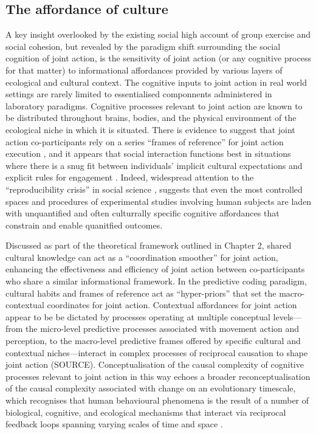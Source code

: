 \subsection{The affordance of culture}
A key insight overlooked by the existing social high account of group exercise and social cohesion, but revealed by the paradigm shift surrounding the social cognition of joint action, is the sensitivity of joint action (or any cognitive process for that matter) to informational affordances provided by various layers of ecological and cultural context.  The cognitive inputs to joint action in real world settings are rarely limited to essentialised componnents administered in laboratory paradigms. Cognitive processes relevant to joint action are known to be distributed throughout brains, bodies, and the physical environment of the ecological niche in which it is situated.  There is evidence to suggest that joint action co-participants rely on a series ``frames of reference'' for joint action execution \citep{Ray2018}, and it appears that social interaction functions best in situations where there is a snug fit between individuals' implicit cultural expectations and explicit rules for engagement \citep{Vollan2017}.  Indeed, widespread attention to the ``reproducibility crisis'' in social science \citep{Earp2015,Rathmacher2017}, suggests that even the most controlled spaces and procedures of experimental studies involving human subjects are laden with unquantified and often culturrally specific cognitive affordances that constrain and enable quanitfied outcomes.

Discussed as part of the theoretical framework outlined in Chapter 2, shared cultural knowledge can act as a ``coordination smoother'' \citep{Vesper2017} for joint action, enhancing the effectiveness and efficiency of joint action between co-participants who share a similar informational framework.  In the predictive coding paradigm, cultural habits and frames of reference act as ``hyper-priors'' that set the macro-contextual coordinates for joint action\citep{Clark2013}.  Contextual affordances for joint action appear to be be dictated by processes operating at multiple conceptual levels---from the micro-level predictive processes associated with movement action and perception, to the macro-level predictive frames offered by specific cultural and contextual niches---interact in complex processes of reciprocal causation to shape joint action (SOURCE).  Conceptualisation of the causal complexity of cognitive processes relevant to joint action in this way echoes a broader reconceptualisation of the causal complexity associated with change on an evolutionary timescale, which recognises that human behavioural phenomena is the result of a number of biological, cognitive, and ecological mechanisms that interact via reciprocal feedback loops spanning varying scales of time and space \citep{Fuentes2015}.

